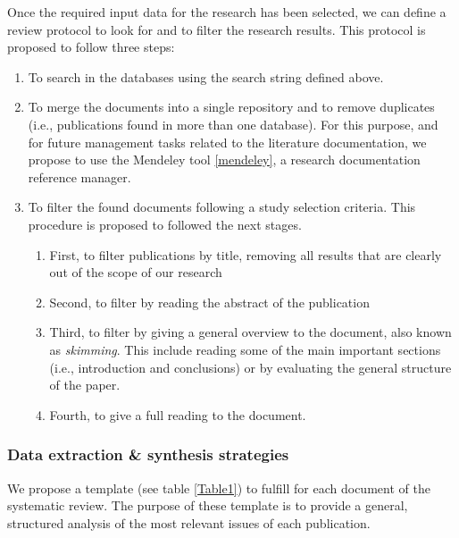 Once the required input data for the research has been selected, we can define a review protocol to look for and to filter the research results. This protocol is proposed to follow three steps:

\begin{enumerate}
\item To search in the databases using the search string defined above.
\item To merge the documents into a single repository and to remove duplicates (i.e., publications found in more than one database). For this purpose, and for future management tasks related to the literature documentation, we propose to use the Mendeley tool \ref{mendeley}, a research documentation reference manager.
\item To filter the found documents following a study selection criteria. This procedure is proposed to followed the next stages.
\begin{enumerate}
\item First, to filter publications by title, removing all results that are clearly out of the scope of our research
\item Second, to filter by reading the abstract of the publication
\item Third, to filter by giving a general overview to the document, also known as \textit{skimming}. This include reading some of the main important sections (i.e., introduction and conclusions) or by evaluating the general structure of the paper.
\item Fourth, to give a full reading to the document.
\end{enumerate}
\end{enumerate}

\subsubsection{Data extraction \& synthesis strategies}

We propose a template (see table \ref{Table1}) to fulfill for each document of the systematic review. The purpose of these template is to provide a general, structured analysis of the most relevant issues of each publication.

